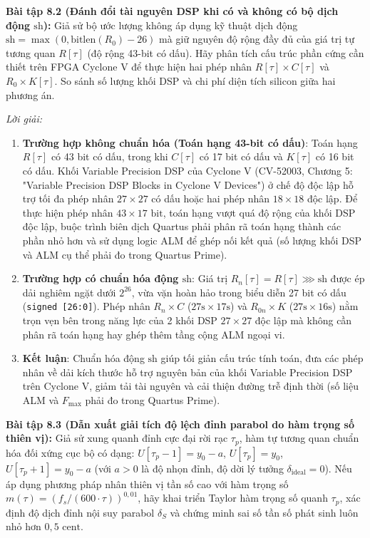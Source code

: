 \textbf{Bài tập 8.2 (Đánh đổi tài nguyên DSP khi có và không có bộ dịch động $\text{sh}$):}
Giả sử bộ ước lượng không áp dụng kỹ thuật dịch động $\text{sh} = \max(0, \text{bitlen}(R_0) - 26)$ mà giữ nguyên độ rộng đầy đủ của giá trị tự tương quan $R[\tau]$ (độ rộng 43-bit có dấu). Hãy phân tích cấu trúc phần cứng cần thiết trên FPGA Cyclone V để thực hiện hai phép nhân $R[\tau] \times C[\tau]$ và $R_0 \times K[\tau]$. So sánh số lượng khối DSP và chi phí diện tích silicon giữa hai phương án.

\textit{Lời giải:}
\begin{enumerate}[leftmargin=1.5em]
    \item \textbf{Trường hợp không chuẩn hóa (Toán hạng 43-bit có dấu)}:
    Toán hạng $R[\tau]$ có 43 bit có dấu, trong khi $C[\tau]$ có 17 bit có dấu và $K[\tau]$ có 16 bit có dấu. Khối Variable Precision DSP của Cyclone V (CV-52003, Chương 5: "Variable Precision DSP Blocks in Cyclone V Devices") ở chế độ độc lập hỗ trợ tối đa phép nhân $27 \times 27$ có dấu hoặc hai phép nhân $18 \times 18$ độc lập. Để thực hiện phép nhân $43 \times 17\text{ bit}$, toán hạng vượt quá độ rộng của khối DSP độc lập, buộc trình biên dịch Quartus phải phân rã toán hạng thành các phần nhỏ hơn và sử dụng logic ALM để ghép nối kết quả (số lượng khối DSP và ALM cụ thể phải đo trong Quartus Prime).
    \item \textbf{Trường hợp có chuẩn hóa động $\text{sh}$}:
    Giá trị $R_n[\tau] = R[\tau] \ggg \text{sh}$ được ép dải nghiêm ngặt dưới $2^{26}$, vừa vặn hoàn hảo trong biểu diễn 27 bit có dấu (\texttt{signed [26:0]}). Phép nhân $R_n \times C$ ($27\text{s} \times 17\text{s}$) và $R_{0n} \times K$ ($27\text{s} \times 16\text{s}$) nằm trọn vẹn bên trong năng lực của 2 khối DSP $27 \times 27$ độc lập mà không cần phân rã toán hạng hay ghép thêm tầng cộng ALM ngoại vi.
    \item \textbf{Kết luận}: Chuẩn hóa động $\text{sh}$ giúp tối giản cấu trúc tính toán, đưa các phép nhân về dải kích thước hỗ trợ nguyên bản của khối Variable Precision DSP trên Cyclone V, giảm tải tài nguyên và cải thiện đường trễ định thời (số liệu ALM và $F_{\max}$ phải đo trong Quartus Prime).
\end{enumerate}

\textbf{Bài tập 8.3 (Dẫn xuất giải tích độ lệch đỉnh parabol do hàm trọng số thiên vị):}
Giả sử xung quanh đỉnh cực đại rời rạc $\tau_p$, hàm tự tương quan chuẩn hóa đối xứng cục bộ có dạng:
$U[\tau_p - 1] = y_0 - a$, $U[\tau_p] = y_0$, $U[\tau_p + 1] = y_0 - a$ (với $a > 0$ là độ nhọn đỉnh, độ dời lý tưởng $\delta_{\text{ideal}} = 0$).
Nếu áp dụng phương pháp nhân thiên vị tần số cao với hàm trọng số $m(\tau) = (f_s / (600 \cdot \tau))^{0{,}01}$, hãy khai triển Taylor hàm trọng số quanh $\tau_p$, xác định độ dịch đỉnh nội suy parabol $\delta_S$ và chứng minh sai số tần số phát sinh luôn nhỏ hơn $0{,}5\text{ cent}$.

